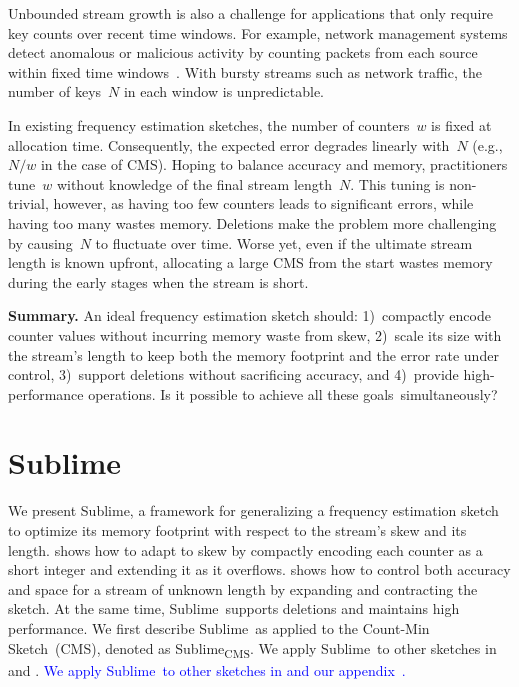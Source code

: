 \documentclass[sigconf]{acmart}
\newcommand{\sketch}{Sublime}
\newcommand{\sketchcms}{\sketch\textsubscript{CMS}\xspace}
\begin{document}
Unbounded stream growth is also a challenge for applications that only require
key counts over recent time windows. For example, network management systems
detect anomalous or malicious activity by counting packets from each source
within fixed time
windows~\cite{SketchBasedChangeDetection,WhatsNew,TrafficManagementSurvey}.
With bursty streams such as network traffic, the number of keys~$N$ in each
window is unpredictable.


In existing frequency estimation sketches, the number of counters~$w$ is fixed
at allocation time. Consequently, the expected error degrades linearly with~$N$
(e.g., $N/w$ in the case of CMS). Hoping to balance accuracy and memory,
practitioners tune~$w$ without knowledge of the final stream length~$N$. This
tuning is non-trivial, however, as having too few counters leads to significant
errors, while having too many wastes memory. Deletions make the problem more
challenging by causing~$N$ to fluctuate over time. Worse yet, even if the
ultimate stream length is known upfront, allocating a large CMS from the start
wastes memory during the early stages when the stream is short. 

\textbf{Summary.}
An ideal frequency estimation sketch should: 1)~compactly encode counter values
without incurring memory waste from skew, 2)~scale its size with the stream's
length to keep both the memory footprint and the error rate under control,
3)~support deletions without sacrificing accuracy, and 4)~provide
  high-performance operations. Is it possible to achieve all these
  goals~simultaneously?

\section{\sketch}\label{sec:sketchbook} 
We present \sketch, a framework for generalizing a frequency estimation sketch
to optimize its memory footprint with respect to the stream's skew and its
length.  shows how to adapt to skew by compactly
encoding each counter as a short integer and extending it as it overflows.
 shows how to control both
accuracy and space for a stream of unknown length by expanding and contracting
the sketch. At the same time, \sketch\ supports deletions and maintains high
performance. We first describe \sketch\ as applied to the Count-Min
Sketch~(CMS), denoted as \sketchcms. 
\ifappendix
We apply \sketch\ to other sketches in 
and .
\else
\textcolor{blue}{We apply \sketch\ to other sketches in 
and our appendix~\cite{SublimeArxiv}.}
\fi
\end{document}
